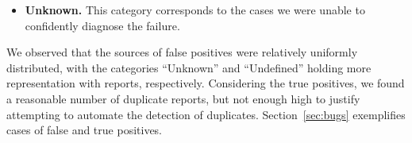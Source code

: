 \documentclass[10pt,conference,anonymous]{IEEEtran}
\begin{document}
\begin{itemize}
  \item \textbf{Unknown.} This category corresponds to the cases we
    were unable to confidently diagnose the failure.

\end{itemize}  

We observed that the sources of false positives were relatively
uniformly distributed, with the categories ``Unknown'' and
``Undefined'' holding more representation with  reports,
respectively. Considering the true positives, we found a reasonable
number of duplicate reports, but not enough high to justify attempting
to automate the detection of duplicates. Section~\ref{sec:bugs}
exemplifies cases of false and true positives.
\end{document}
